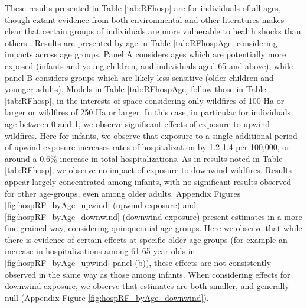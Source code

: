 \documentclass[11pt]{article}
\begin{document}
\begin{spacing}{1.5}
These results presented in Table \ref{tab:RFhosp} are for individuals of all ages, though extant evidence from both environmental and other literatures makes clear that certain groups of individuals are more vulnerable to health shocks than others \citep{OgasawaraYumitori2019,UNICEF2021,Almondetal2018}.  Results are presented by age in Table \ref{tab:RFhospAge} considering impacts across age groups.  Panel A considers ages which are potentially more exposed (infants and young children, and individuals aged 65 and above), while panel B considers groups which are likely less sensitive (older children and younger adults).  Models in Table \ref{tab:RFhospAge} follow those in Table \ref{tab:RFhosp}, in the interests of space considering only wildfires of 100 Ha or larger or wildfires of 250 Ha or larger.  In this case, in particular for individuals age between 0 and 1, we observe significant effects of exposure to upwind wildfires. 
Here for infants, we observe that exposure to a single additional period of upwind exposure increases rates of hospitalization by 1.2-1.4 per 100,000, or around a 0.6\% increase in total hospitalizations. As in results noted in Table \ref{tab:RFhosp}, we observe no impact of exposure to downwind wildfires.  Results appear largely concentrated among infants, with no significant results observed for other age-groups, even among older adults.  Appendix Figures \ref{fig:hospRF_byAge_upwind} (upwind exposure) and \ref{fig:hospRF_byAge_downwind} (downwind exposure) present estimates in a more fine-grained way, considering quinquennial age groups.  Here we observe that while there is evidence of certain effects at specific older age groups (for example an increase in hospitalizations among 61-65 year-olds in \ref{fig:hospRF_byAge_upwind} panel (b)), these effects are not consistently observed in the same way as those among infants.  When considering effects for downwind exposure, we observe that estimates are both smaller, and generally null (Appendix Figure \ref{fig:hospRF_byAge_downwind}).



\end{spacing}
\end{document}
